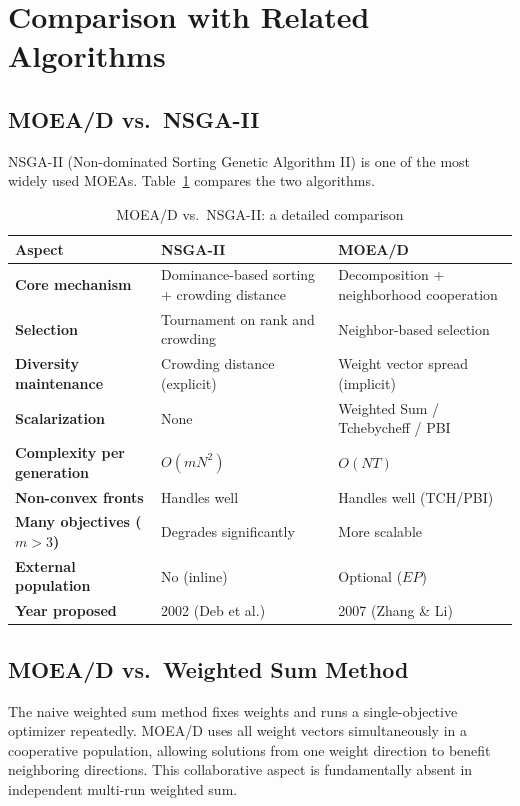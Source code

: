 \documentclass[12pt,a4paper]{article}
\begin{document}
\section{Comparison with Related Algorithms}
\label{sec:comparison}

\subsection{MOEA/D vs.\ NSGA-II}

NSGA-II (Non-dominated Sorting Genetic Algorithm II) is one of the most widely used MOEAs. Table~\ref{tab:nsga_moead} compares the two algorithms.

\begin{table}[H]
\centering
\caption{MOEA/D vs.\ NSGA-II: a detailed comparison}
\label{tab:nsga_moead}
\renewcommand{\arraystretch}{1.4}
\begin{tabular}{>{\bfseries}p{3.5cm} p{5cm} p{5cm}}
\toprule
\textbf{Aspect} & \textbf{NSGA-II} & \textbf{MOEA/D} \\
\midrule
Core mechanism & Dominance-based sorting + crowding distance & Decomposition + neighborhood cooperation \\
Selection & Tournament on rank and crowding & Neighbor-based selection \\
Diversity maintenance & Crowding distance (explicit) & Weight vector spread (implicit) \\
Scalarization & None & Weighted Sum / Tchebycheff / PBI \\
Complexity per generation & $O(mN^2)$ & $O(NT)$ \\
Non-convex fronts & Handles well & Handles well (TCH/PBI) \\
Many objectives ($m>3$) & Degrades significantly & More scalable \\
External population & No (inline) & Optional ($EP$) \\
Year proposed & 2002 (Deb et al.) & 2007 (Zhang \& Li) \\
\bottomrule
\end{tabular}
\end{table}

\subsection{MOEA/D vs.\ Weighted Sum Method}

The naive weighted sum method fixes weights and runs a single-objective optimizer repeatedly. MOEA/D uses all weight vectors simultaneously in a cooperative population, allowing solutions from one weight direction to benefit neighboring directions. This collaborative aspect is fundamentally absent in independent multi-run weighted sum.
\end{document}

